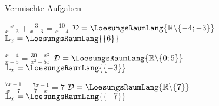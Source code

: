 \platzFuerBerechnungenBisEndeSeite{}




Vermischte Aufgaben


\begin{bbwAufgabenBlock}
\item $\frac{x}{x+3} + \frac{3}{x+3} = \frac{10}{x+4}$ \hspace{10mm}
$\mathcal{D}= \LoesungsRaumLang{\mathbb{R}\backslash\{-4;-3\}}$
$\mathbb{L}_x = \LoesungsRaumLang{\{  6  \}}$
\item $\frac{x-4}{x-5}  = \frac{30-x^2}{x^2-5x}$ \hspace{10mm}
$\mathcal{D}= \LoesungsRaumLang{\mathbb{R}\backslash\{0;5 \}}$
$\mathbb{L}_x = \LoesungsRaumLang{\{  -3  \}}$
\item $\frac{7x+1}{x-7}   - \frac{7x-1}{7-x} = 7$ \hspace{10mm}
$\mathcal{D}= \LoesungsRaumLang{\mathbb{R}\backslash\{7 \}}$
$\mathbb{L}_x = \LoesungsRaumLang{\{  -7  \}}$

\end{bbwAufgabenBlock}

\platzFuerBerechnungenBisEndeSeite{}




